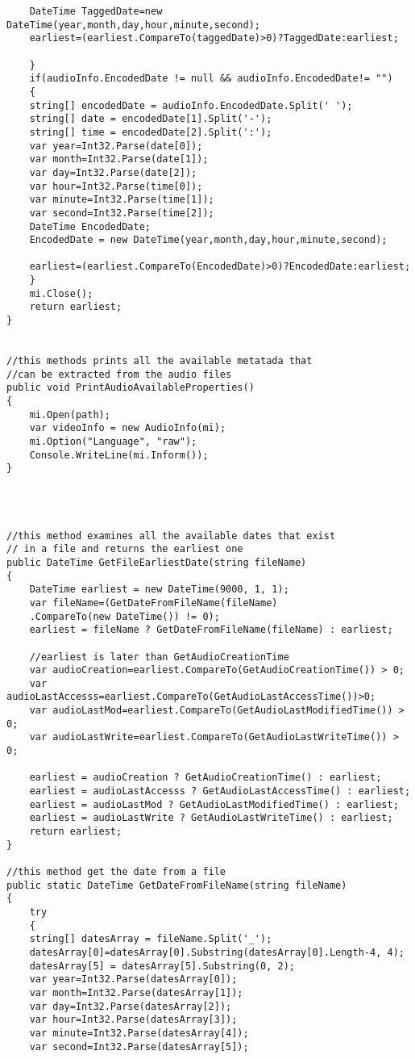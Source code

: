 \begin{lstlisting}
	DateTime TaggedDate=new DateTime(year,month,day,hour,minute,second);
	earliest=(earliest.CompareTo(taggedDate)>0)?TaggedDate:earliest;

	}
	if(audioInfo.EncodedDate != null && audioInfo.EncodedDate!= "")
	{
	string[] encodedDate = audioInfo.EncodedDate.Split(' ');
	string[] date = encodedDate[1].Split('-');
	string[] time = encodedDate[2].Split(':');
	var year=Int32.Parse(date[0]);
	var month=Int32.Parse(date[1]);
	var day=Int32.Parse(date[2]);
	var hour=Int32.Parse(time[0]);
	var minute=Int32.Parse(time[1]);
	var second=Int32.Parse(time[2]);
	DateTime EncodedDate;
	EncodedDate = new DateTime(year,month,day,hour,minute,second);

	earliest=(earliest.CompareTo(EncodedDate)>0)?EncodedDate:earliest;
	}
	mi.Close();
	return earliest;
}


//this methods prints all the available metatada that 
//can be extracted from the audio files
public void PrintAudioAvailableProperties()
{
	mi.Open(path);
	var videoInfo = new AudioInfo(mi);
	mi.Option("Language", "raw");
	Console.WriteLine(mi.Inform());
}




//this method examines all the available dates that exist 
// in a file and returns the earliest one
public DateTime GetFileEarliestDate(string fileName)
{
	DateTime earliest = new DateTime(9000, 1, 1);
	var fileName=(GetDateFromFileName(fileName)
	.CompareTo(new DateTime()) != 0);
	earliest = fileName ? GetDateFromFileName(fileName) : earliest;

	//earliest is later than GetAudioCreationTime
	var audioCreation=earliest.CompareTo(GetAudioCreationTime()) > 0;
	var audioLastAccesss=earliest.CompareTo(GetAudioLastAccessTime())>0;
	var audioLastMod=earliest.CompareTo(GetAudioLastModifiedTime()) > 0;
	var audioLastWrite=earliest.CompareTo(GetAudioLastWriteTime()) > 0;

	earliest = audioCreation ? GetAudioCreationTime() : earliest;
	earliest = audioLastAccesss ? GetAudioLastAccessTime() : earliest;
	earliest = audioLastMod ? GetAudioLastModifiedTime() : earliest;
	earliest = audioLastWrite ? GetAudioLastWriteTime() : earliest;
	return earliest;
}

//this method get the date from a file
public static DateTime GetDateFromFileName(string fileName)
{
	try
	{
	string[] datesArray = fileName.Split('_');
	datesArray[0]=datesArray[0].Substring(datesArray[0].Length-4, 4);
	datesArray[5] = datesArray[5].Substring(0, 2);
	var year=Int32.Parse(datesArray[0]);
	var month=Int32.Parse(datesArray[1]);
	var day=Int32.Parse(datesArray[2]);
	var hour=Int32.Parse(datesArray[3]);
	var minute=Int32.Parse(datesArray[4]);
	var second=Int32.Parse(datesArray[5]);



\end{lstlisting}
